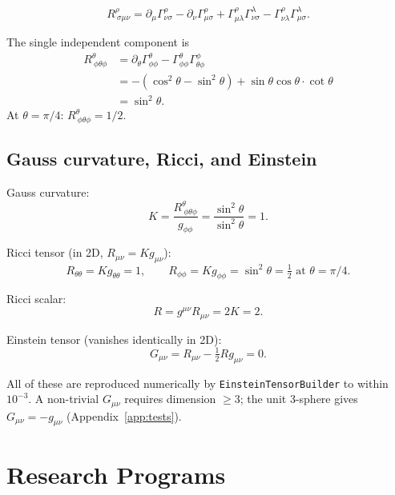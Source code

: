 \documentclass[11pt,twoside]{book}
\begin{document}
\begin{equation}
R^\rho_{\ \sigma\mu\nu} = \partial_\mu\Gamma^\rho_{\nu\sigma}
- \partial_\nu\Gamma^\rho_{\mu\sigma}
+ \Gamma^\rho_{\mu\lambda}\Gamma^\lambda_{\nu\sigma}
- \Gamma^\rho_{\nu\lambda}\Gamma^\lambda_{\mu\sigma}.
\end{equation}

The single independent component is
\begin{align}
R^\theta_{\ \phi\theta\phi}
&= \partial_\theta\Gamma^\theta_{\phi\phi} - \Gamma^\theta_{\phi\phi}\Gamma^\phi_{\theta\phi} \\
&= -\left(\cos^2\theta-\sin^2\theta\right) + \sin\theta\cos\theta\cdot\cot\theta \\
&= \sin^2\theta.
\end{align}
At $\theta=\pi/4$: $R^\theta_{\ \phi\theta\phi}=1/2$.

\section{Gauss curvature, Ricci, and Einstein}

Gauss curvature:
\begin{equation}
K = \frac{R^\theta_{\ \phi\theta\phi}}{g_{\phi\phi}}
= \frac{\sin^2\theta}{\sin^2\theta} = 1.
\end{equation}

Ricci tensor (in 2D, $R_{\mu\nu}=K g_{\mu\nu}$):
\begin{equation}
R_{\theta\theta}=K g_{\theta\theta}=1,\qquad
R_{\phi\phi}=K g_{\phi\phi}=\sin^2\theta=\tfrac12 \text{ at }\theta=\pi/4.
\end{equation}

Ricci scalar:
\begin{equation}
R = g^{\mu\nu}R_{\mu\nu} = 2K = 2.
\end{equation}

Einstein tensor (vanishes identically in 2D):
\begin{equation}
G_{\mu\nu} = R_{\mu\nu} - \tfrac12 R g_{\mu\nu} = 0.
\end{equation}

All of these are reproduced numerically by \texttt{EinsteinTensorBuilder} to within
$10^{-3}$. A non-trivial $G_{\mu\nu}$ requires dimension $\ge3$; the unit 3-sphere gives
$G_{\mu\nu}=-g_{\mu\nu}$ (Appendix~\ref{app:tests}).


\chapter{Research Programs}
\label{app:programs}
\end{document}
